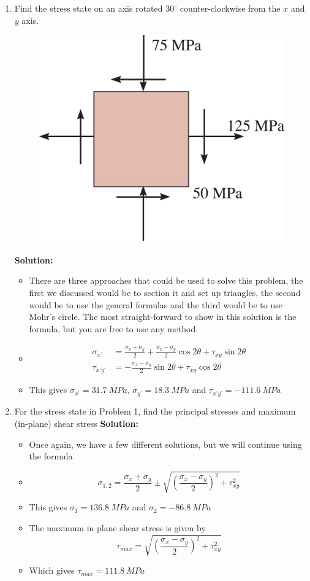 \documentclass[12pt, oneside]{article}
\begin{document}
\begin{enumerate}
	\item %
		Find the stress state on an axis rotated $30^\circ$ counter-clockwise from the $x$ and $y$ axis.
		\begin{figure}[H]
			\centering
			\includegraphics[width=0.6\linewidth]{9-17}
		\end{figure}
			\textbf{Solution:}
			\begin{itemize}
				\item There are three approaches that could be used to solve this problem, the first we discussed would be to section it and set up triangles, the second would be to use the general formulas and the third would be to use Mohr's circle.
					The most straight-forward to show in this solution is the formula, but you are free to use any method.
				\item 
$$\begin{aligned}
  \sigma_{x^\prime} &= \frac{\sigma_x+\sigma_y}{2} + \frac{\sigma_x-\sigma_y}{2} \cos 2\theta + \tau_{xy} \sin 2\theta \\
  \tau_{x^\prime y^\prime} &= - \frac{\sigma_x-\sigma_y}{2}\sin 2\theta + \tau_{xy} \cos 2\theta
\end{aligned}$$
				\item This gives $\sigma_{x^\prime} = 	\SI{31.7 }{MPa} $, $\sigma_{y^\prime} = 	\SI{18.3 }{MPa} $ and $\tau_{x^\prime y^\prime} = 	\SI{-111.6}{MPa} $
			\end{itemize}

	\item For the stress state in Problem 1, find the principal stresses and maximum (in-plane) shear stress
			\textbf{Solution:}
			\begin{itemize}
				\item Once again, we have a few different solutions, but we will continue using the formula
				\item 
$$\sigma_{1,2} = \frac{\sigma_x+\sigma_y}{2} \pm \sqrt {\left( \frac{\sigma_x-\sigma_y}{2}\right)^2 + \tau_{xy}^2}$$
				\item This gives $\sigma_1 = 	\SI{136.8}{MPa} $ and $\sigma_2 = 	\SI{-86.8}{MPa} $
				\item The maximum in plane shear stress is given by 
$$\tau_{max} = \sqrt{\left( \frac{\sigma_x-\sigma_y}{2} \right)^2 + \tau_{xy}^2}$$
				\item Which gives $\tau_{max} = 	\SI{111.8 }{MPa} $
			\end{itemize}


\end{enumerate}
\end{document}
